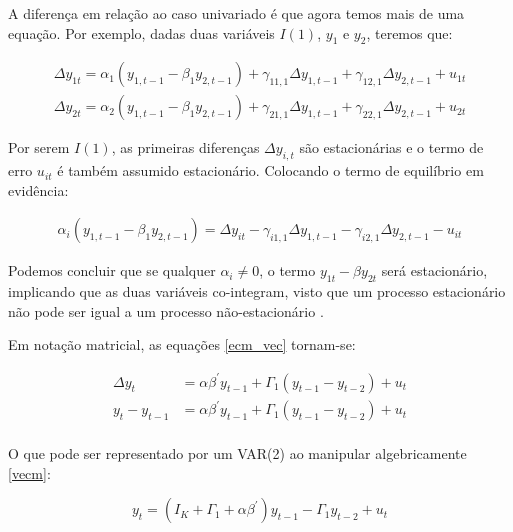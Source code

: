 \documentclass[a4paper,
               article,
               12pt,
               openany,
               oneside,
               english,
               brazil]{abntex2}
\numberwithin{equation}{section}
\begin{document}
    A diferença em relação ao caso univariado é que agora temos mais de uma equação. Por exemplo, dadas duas variáveis $ I(1) $, $ y_1 $ e $ y_2 $, teremos que:

    \begin{equation}
        \begin{aligned}
            \label{ecm_vec}
            \Delta y_{1t} = \alpha_1 (y_{1,t-1} - \beta_1 y_{2, t-1}) + \gamma_{11,1} \Delta y_{1,t-1} + \gamma_{12,1} \Delta y_{2,t-1} + u_{1t} \\
            \Delta y_{2t} = \alpha_2 (y_{1,t-1} - \beta_1 y_{2, t-1}) + \gamma_{21,1} \Delta y_{1,t-1} + \gamma_{22,1} \Delta y_{2,t-1} + u_{2t}
        \end{aligned}
    \end{equation}

    Por serem $ I(1) $, as primeiras diferenças $ \Delta y_{i,t} $ são estacionárias e o termo de erro $ u_{it} $ é também assumido estacionário. Colocando o termo de equilíbrio em evidência:

    \begin{align*}
        \alpha_i (y_{1,t-1} - \beta_1 y_{2, t-1}) = \Delta y_{it} - \gamma_{i1,1} \Delta y_{1,t-1} - \gamma_{i2,1} \Delta y_{2,t-1} - u_{it}
    \end{align*}

    Podemos concluir que se qualquer $ \alpha_{i} \neq 0 $, o termo $ y_{1t} - \beta y_{2t} $ será estacionário, implicando que as duas variáveis co-integram, visto que um processo estacionário não pode ser igual a um processo não-estacionário \cite[p.~244-247]{lutkepool}.

    Em notação matricial, as equações \eqref{ecm_vec} tornam-se:

    \begin{equation}
        \label{vecm}
        \begin{aligned}
            \Delta y_t &= \alpha \beta^{'} y_{t-1} + \Gamma_1(y_{t-1} - y_{t-2}) + u_t \\
            y_t - y_{t-1} &= \alpha \beta^{'} y_{t-1} + \Gamma_1(y_{t-1} - y_{t-2}) + u_t \\
        \end{aligned}
    \end{equation}

    O que pode ser representado por um VAR(2) ao manipular algebricamente \eqref{vecm}:

    \begin{equation}
        \label{vecm-var}
        y_t = (I_K + \Gamma_1 + \alpha \beta^{'})y_{t-1} - \Gamma_1 y_{t-2} + u_t
    \end{equation}
\end{document}
